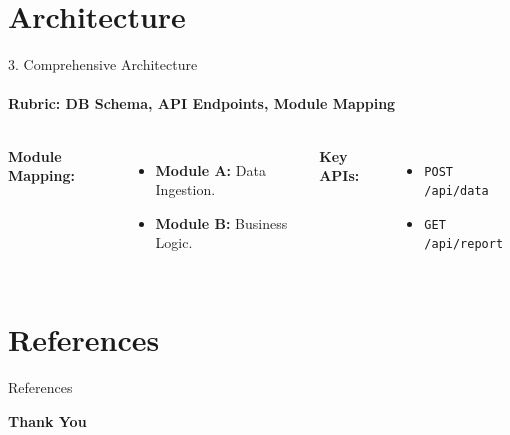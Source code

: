 \documentclass[aspectratio=169, 11pt]{beamer}
\begin{document}
\section{Architecture}
\begin{frame}{3. Comprehensive Architecture}
    \framesubtitle{Rubric: DB Schema, API Endpoints, Module Mapping}
    \begin{columns}
        \textbf{Module Mapping:}
        \begin{itemize}
            \item \textbf{Module A:} Data Ingestion.
            \item \textbf{Module B:} Business Logic.
        \end{itemize}
        \textbf{Key APIs:}
        \begin{itemize}
            \item \texttt{POST /api/data}
            \item \texttt{GET /api/report}
        \end{itemize}
        
        \centering
    \end{columns}
\end{frame}

\section{References}
\begin{frame}[allowframebreaks]{References}
    
     
\end{frame}

\begin{frame}
    \centering    
    {\Huge \textbf{\textcolor{amritaMaroon}{Thank You}}}
\end{frame}
\end{document}
